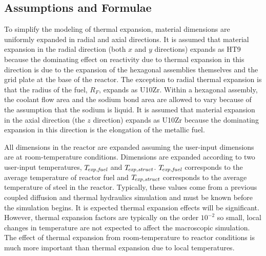   \subsection{Assumptions and Formulae}
  \label{sec:model_details__assumptions_and_formulae}
    To simplify the modeling of thermal expansion, material dimensions are
    uniformly expanded in radial and axial directions. It is assumed that 
    material expansion in the radial direction (both $x$ and $y$ directions) 
    expands as HT9 because the dominating effect on reactivity due to thermal 
    expansion in this direction is due to the expansion of the hexagonal 
    assemblies themselves and the grid plate at the base of the reactor. The 
    exception to radial thermal expansion is that the radius of the fuel, 
    $R_F$, expands as U10Zr.  Within a hexagonal assembly, the coolant flow area 
    and the sodium bond area are allowed to vary because of the assumption that 
    the sodium is liquid.  It is assumed that material expansion in the axial 
    direction (the $z$ direction) expands as U10Zr because the dominating 
    expansion in this direction is the elongation of the metallic fuel.
    
    All dimensions in the reactor are expanded assuming the user-input 
    dimensions are at room-temperature conditions. Dimensions are expanded
    according to two user-input temperatures, ${T_{\!\mbox{\scriptsize \em exp,fuel}}}$ and $T_{\!\mbox{\scriptsize \em exp,struct}}$.
    ${T_{\!\mbox{\scriptsize \em exp,fuel}}}$ corresponds to the average temperature of reactor fuel and
    $T_{\!\mbox{\scriptsize \em exp,struct}}$ corresponds to the average temperature of steel in the
    reactor. Typically, these values come from a previous coupled diffusion and
    thermal hydraulics simulation and must be known before the simulation 
    begins. It is expected thermal expansion effects will be significant. 
    However, thermal expansion factors are typically on the order $10^{-2}$ so 
    small, local changes in temperature are not expected to affect the 
    macroscopic simulation. The effect of thermal expansion from
    room-temperature to reactor conditions is much more important than thermal
    expansion due to local temperatures.

